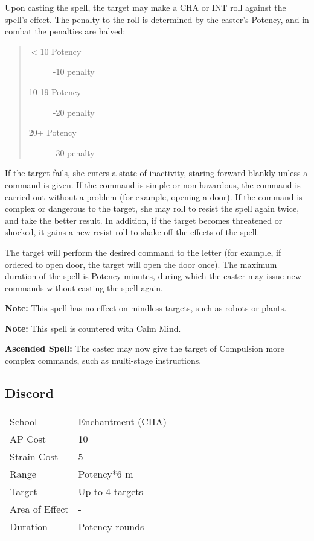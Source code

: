 \documentclass[11pt,a4paper,twocolumn]{book}
\begin{document}
Upon casting the spell, the target may make a CHA or INT roll against the spell's effect. The penalty to the roll is determined by the caster's Potency, and in combat the penalties are halved:

\begin{quote}
	\begin{description}
		\item[$<$10 Potency] 	-10 penalty
		\item[10-19 Potency] 	-20 penalty
		\item[20+ Potency] 	-30 penalty
	\end{description}
\end{quote}

If the target fails, she enters a state of inactivity, staring forward blankly unless a command is given. If the command is simple or non-hazardous, the command is carried out without a problem (for example, opening a door). If the command is complex or dangerous to the target, she may roll to resist the spell again twice, and take the better result. In addition, if the target becomes threatened or shocked, it gains a new resist roll to shake off the effects of the spell.

The target will perform the desired command to the letter (for example, if ordered to open door, the target will open the door once). The maximum duration of the spell is Potency minutes, during which the caster may issue new commands without casting the spell again.

\textbf{Note:} This spell has no effect on mindless targets, such as robots or plants.

\textbf{Note:} This spell is countered with Calm Mind.

\bigskip

\textbf{Ascended Spell:} The caster may now give the target of Compulsion more complex commands, such as multi-stage instructions.

\subsection*{Discord}
{
	\begin{tabu} to 75mm{| X[l,4] | X[l,7] |}
		\hline
		School 			& Enchantment (CHA) 	\\
		AP Cost	      	& 10 					\\
		Strain Cost     & 5 					\\
		Range     		& Potency*6 m			\\
		Target      	& Up to 4 targets	\\
		Area of Effect  & -  	 				\\
		Duration     	& Potency rounds 		\\ \hline
	\end{tabu}
	
}
\end{document}
